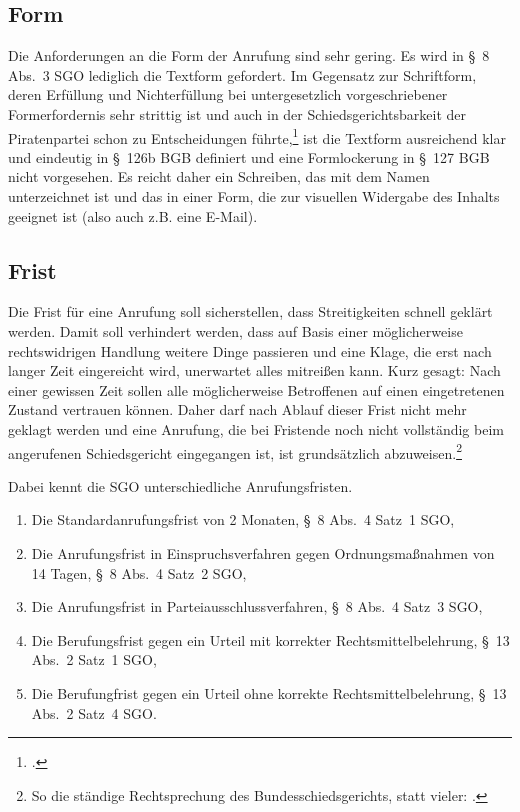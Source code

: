 \subsection{Form}
\label{Anrufung:Kriterien:Form}
Die Anforderungen an die Form der Anrufung sind sehr gering.
Es wird in \S~8 Abs.~3 SGO lediglich die Textform gefordert.
Im Gegensatz zur Schriftform, deren Erfüllung und Nichterfüllung bei untergesetzlich vorgeschriebener Formerfordernis sehr strittig ist und auch in der Schiedsgerichtsbarkeit der Piratenpartei schon zu Entscheidungen führte,\footcite{LSGBB146} ist die Textform ausreichend klar und eindeutig in \S~126b BGB definiert und eine Formlockerung in \S~127 BGB nicht vorgesehen.
Es reicht daher ein Schreiben, das mit dem Namen unterzeichnet ist und das in einer Form, die zur visuellen Widergabe des Inhalts geeignet ist (also auch z.B. eine E-Mail).

\subsection{Frist}
\label{Anrufung:Kriterien:Frist}
Die Frist für eine Anrufung soll sicherstellen, dass Streitigkeiten schnell geklärt werden.
Damit soll verhindert werden, dass auf Basis einer möglicherweise rechtswidrigen Handlung weitere Dinge passieren und eine Klage, die erst nach langer Zeit eingereicht wird, unerwartet alles mitreißen kann.
Kurz gesagt: Nach einer gewissen Zeit sollen alle möglicherweise Betroffenen auf einen eingetretenen Zustand vertrauen können.
Daher darf nach Ablauf dieser Frist nicht mehr geklagt werden und eine Anrufung, die bei Fristende noch nicht vollständig beim angerufenen Schiedsgericht eingegangen ist, ist grundsätzlich abzuweisen.\footnote{So die ständige Rechtsprechung des Bundesschiedsgerichts, statt vieler: \cites{BSG2315HS}{BSG20130227}.}

Dabei kennt die SGO unterschiedliche Anrufungsfristen.
\begin{enumerate}
\item Die Standardanrufungsfrist von 2 Monaten, \S~8 Abs.~4 Satz~1 SGO,
\item Die Anrufungsfrist in Einspruchsverfahren gegen Ordnungsmaßnahmen von 14 Tagen, \S~8 Abs.~4 Satz~2 SGO,
\item Die Anrufungsfrist in Parteiausschlussverfahren, \S~8 Abs.~4 Satz~3 SGO,
\item Die Berufungsfrist gegen ein Urteil mit korrekter Rechtsmittelbelehrung, \S~13 Abs.~2 Satz~1 SGO,
\item Die Berufungfrist gegen ein Urteil ohne korrekte Rechtsmittelbelehrung, \S~13 Abs.~2 Satz~4 SGO.
\end{enumerate}

